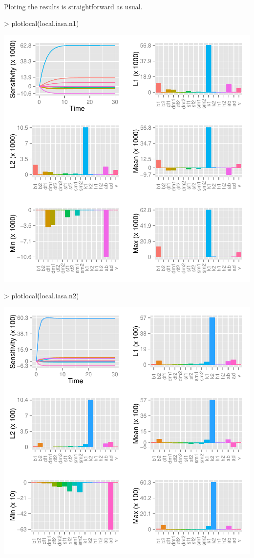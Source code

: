 \documentclass[a4paper]{article}
\begin{document}
Ploting the results is straightforward as usual.
\begin{Schunk}
\begin{Sinput}
> plotlocal(local.iasa.n1)
\end{Sinput}
\end{Schunk}
\begin{center}
\includegraphics{capm_example-048}
\end{center}
\begin{Schunk}
\begin{Sinput}
> plotlocal(local.iasa.n2)
\end{Sinput}
\end{Schunk}
\begin{center}
\includegraphics{capm_example-050}
\end{center}
\end{document}
